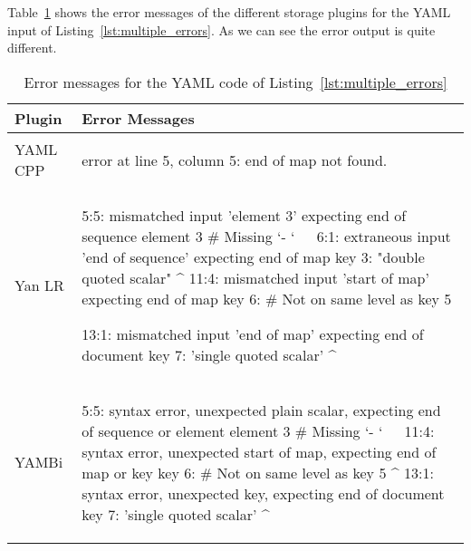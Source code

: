 Table~\ref{tab:error_messages_final_multiple_errors} shows the error messages of the different storage plugins for the YAML input of Listing~\ref{lst:multiple_errors}. As we can see the error output is quite different.

\begin{table}[H]
  \caption{Error messages for the YAML code of Listing~\ref{lst:multiple_errors}}
  \label{tab:error_messages_final_multiple_errors}
  \centering

  \begin{tabular}{lp{}}
    \toprule
    Plugin & Error Messages\\
    \midrule

    \vspace{0cm}
    YAML CPP &
    \vspace{-0.36cm}
    \begin{textcode}
      error at line 5, column 5: end of map not found.
    \end{textcode}
    \\

    \vspace{0cm}
    Yan LR &
    \vspace{-0.36cm}
    \begin{textcode}
      5:5: mismatched input 'element 3' expecting end of sequence
               element 3 # Missing `- `
               ^^^^^^^^^
      6:1: extraneous input 'end of sequence' expecting end of map
           key 3: "double quoted scalar"
           ^
      11:4: mismatched input 'start of map' expecting end of map
               key 6: # Not on same level as key 5

      13:1: mismatched input 'end of map' expecting end of document
            key 7: 'single quoted scalar'
            ^
    \end{textcode}
    \\

    \vspace{0cm}
    YAMBi &
    \vspace{-0.36cm}
    \begin{textcode}
      5:5: syntax error, unexpected plain scalar,
           expecting end of sequence or element
               element 3 # Missing `- `
               ^^^^^^^^^
      11:4: syntax error, unexpected start of map,
            expecting end of map or key
               key 6: # Not on same level as key 5
               ^
      13:1: syntax error, unexpected key, expecting end of document
            key 7: 'single quoted scalar'
            ^
    \end{textcode}
    \\


\end{tabular}
\end{table}
